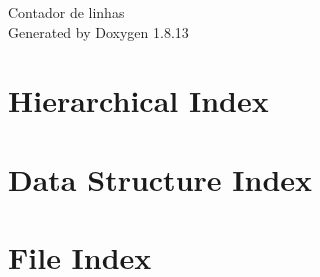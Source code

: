 \documentclass[twoside]{book}
\newcommand{\+}{\discretionary{\mbox{\scriptsize$\hookleftarrow$}}{}{}}
\newcommand{\clearemptydoublepage}{%
  \newpage{\pagestyle{empty}\cleardoublepage}%
}
\begin{document}
\hypersetup{pageanchor=false,
             bookmarksnumbered=true,
             pdfencoding=unicode
            }
\begin{titlepage}
\vspace*{7cm}
\begin{center}%
{\Large Contador de linhas }\\
\vspace*{1cm}
{\large Generated by Doxygen 1.8.13}\\
\end{center}
\end{titlepage}
\clearemptydoublepage
{}
\tableofcontents
\clearemptydoublepage
{}
\hypersetup{pageanchor=true}

\chapter{Hierarchical Index}

\chapter{Data Structure Index}

\chapter{File Index}

\end{document}
